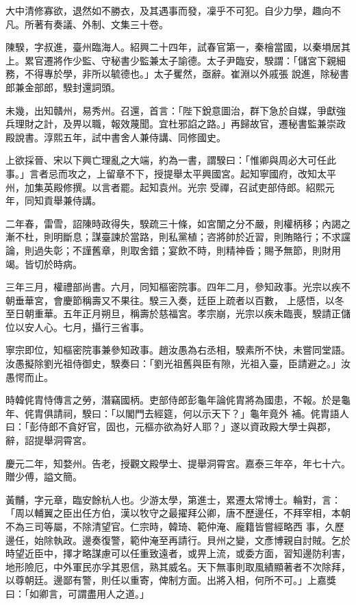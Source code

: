 \begin{pinyinscope}
 大中清修寡欲，退然如不勝衣，及其遇事而發，凜乎不可犯。自少力學，趣向不凡。所著有奏議、外制、文集三十卷。



 陳騤，字叔進，臺州臨海人。紹興二十四年，試春官第一，秦檜當國，以秦塤居其上。累官遷將作少監、守秘書少監兼太子諭德。太子尹臨安，騤謂：「儲宮下親細務，不得專於學，非所以毓德也。」太子矍然，亟辭。崔淵以外戚張
 說進，除秘書郎兼金部郎，騤封還詞頭。



 未幾，出知贛州，易秀州。召還，首言：「陛下銳意圖治，群下急於自媒，爭獻強兵理財之計，及畀以職，報效蔑聞。宜杜邪諂之路。」再歸故官，遷秘書監兼崇政殿說書。淳熙五年，試中書舍人兼侍講、同修國史。



 上欲採晉、宋以下興亡理亂之大端，約為一書，謂騤曰：「惟卿與周必大可任此事。」言者忌而攻之，上留章不下，授提舉太平興國宮。起知寧國府，改知太平州，加集英殿修撰。以言者罷。起知袁州。光宗
 受禪，召試吏部侍郎。紹熙元年，同知貢舉兼侍講。



 二年春，雷雪，詔陳時政得失，騤疏三十條，如宮闈之分不嚴，則權柄移；內謁之漸不杜，則明斷息；謀臺諫於當路，則私黨植；咨將帥於近習，則賄賂行；不求讜論，則過失彰；不謹舊章，則取舍錯；宴飲不時，則精神昏；賜予無節，則財用竭。皆切於時病。



 三年三月，權禮部尚書。六月，同知樞密院事。四年二月，參知政事。光宗以疾不朝垂華宮，會慶節稱壽又不果往。騤三入奏，廷臣上疏者以百數，
 上感悟，以冬至日朝重華。五年正月朔旦，稱壽於慈福宮。孝宗崩，光宗以疾未臨喪，騤請正儲位以安人心。七月，攝行三省事。



 寧宗即位，知樞密院事兼參知政事。趙汝愚為右丞相，騤素所不快，未嘗同堂語。汝愚擬除劉光祖侍御史，騤奏曰：「劉光祖舊與臣有隙，光祖入臺，臣請避之。」汝愚愕而止。



 時韓侂胄恃傳言之勞，潛竊國柄。吏部侍郎彭龜年論侂胄將為國患，不報。於是龜年、侂胄俱請祠，騤曰：「以閣門去經筵，何以示天下？」龜年竟外
 補。侂胄語人曰：「彭侍郎不貪好官，固也，元樞亦欲為好人耶？」遂以資政殿大學士與郡，辭，詔提舉洞霄宮。



 慶元二年，知婺州。告老，授觀文殿學士、提舉洞霄宮。嘉泰三年卒，年七十六。贈少傅，謚文簡。



 黃黼，字元章，臨安餘杭人也。少游太學，第進士，累遷太常博士。輪對，言：「周以輔翼之臣出任方伯，漢以牧守之最擢拜公卿，唐不歷邊任，不拜宰相，本朝不為三司等屬，不除清望官。仁宗時，韓琦、範仲淹、龐籍皆嘗經略西
 事，久歷邊任，始除執政。邊奏復警，範仲淹至再請行。貝州之變，文彥博親自討賊。乞於時望近臣中，擇才略謀慮可以任重致遠者，或畀上流，或委方面，習知邊防利害，地形險厄，中外軍民亦孚其恩信，熟其威名。天下無事則取風績顯著者不次除拜，以尊朝廷。邊鄙有警，則任以重寄，俾制方面。出將入相，何所不可。」上嘉獎曰：「如卿言，可謂盡用人之道。」




\end{pinyinscope}
